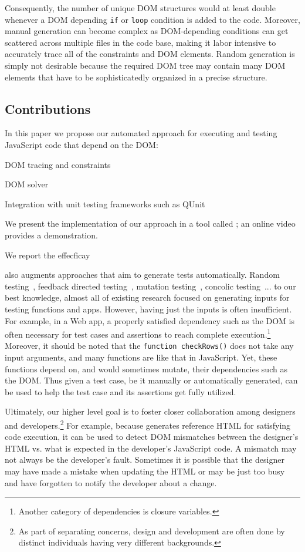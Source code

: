 Consequently, the number of unique DOM structures would at least double whenever a DOM depending {\tt if} or {\tt loop} condition is added to the code.
Moreover, manual generation can become complex as DOM-depending conditions can get scattered across multiple files in the code base, making it labor intensive to accurately trace all of the constraints and DOM elements.
Random generation is simply not desirable because the required DOM tree may contain many DOM elements that have to be sophisticatedly organized in a precise structure.

\subsection{Contributions}
In this paper we propose our automated approach for executing and testing JavaScript code that depend on the DOM:
\begin {compactitem}
\item DOM tracing and constraints
\item DOM solver
\item Integration with unit testing frameworks such as QUnit
\item We present the implementation of our approach in a tool called \tool; an online video provides a demonstration.
\item We report the effecficay 
\end {compactitem}

\tool also augments approaches that aim to generate tests automatically.  
Random testing~\cite{}, feedback directed testing~\cite{}, mutation testing~\cite{}, concolic testing~\cite{}... to our best knowledge, almost all of existing research focused on generating inputs for testing functions and apps.
However, having just the inputs is often insufficient.  For example, in a Web app, a properly satisfied dependency such as the DOM is often necessary for test cases and assertions to reach complete execution.\footnote{Another category of dependencies is closure variables.}
Moreover, it should be noted that the {\tt function checkRows()} does not take any input arguments, and many functions are like that in JavaScript.
Yet, these functions depend on, and would sometimes mutate, their dependencies such as the DOM.
Thus given a test case, be it manually or automatically generated, \tool can be used to help the test case and its assertions get fully utilized.

Ultimately, our higher level goal is to foster closer collaboration among designers and developers.\footnote{As part of separating concerns, design and development are often done by distinct individuals having very different backgrounds.}
For example, because \tool generates reference HTML for satisfying code execution, it can be used to detect DOM mismatches between the designer's HTML vs. what is expected in the developer's JavaScript code.
A mismatch may not always be the developer's fault.  Sometimes it is possible that the designer may have made a mistake when updating the HTML or may be just too busy and have forgotten to notify the developer about a change.

